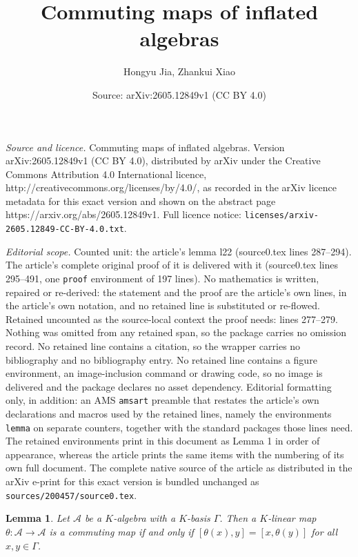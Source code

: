 \documentclass[10pt,a4paper]{amsart}
\title{Commuting maps of inflated algebras}
\author{Hongyu Jia, Zhankui Xiao}
\date{Source: arXiv:2605.12849v1 (CC BY 4.0)}
\newtheorem{lemma}{Lemma}
\begin{document}
\maketitle

\noindent\emph{Source and licence.} Commuting maps of inflated algebras. Version arXiv:2605.12849v1 (CC BY 4.0), distributed by arXiv under the Creative Commons Attribution 4.0 International licence, http://creativecommons.org/licenses/by/4.0/, as recorded in the arXiv licence metadata for this exact version and shown on the abstract page https://arxiv.org/abs/2605.12849v1. Full licence notice: \texttt{licenses/arxiv-2605.12849-CC-BY-4.0.txt}.\par\smallskip

\noindent\textit{Editorial scope.} Counted unit: the article's lemma l22 (source0.tex lines 287--294). The article's complete original proof of it is delivered with it (source0.tex lines 295--491, one \texttt{proof} environment of 197 lines). No mathematics is written, repaired or re-derived: the statement and the proof are the article's own lines, in the article's own notation, and no retained line is substituted or re-flowed.  Retained uncounted as the source-local context the proof needs: lines 277--279.  Nothing was omitted from any retained span, so the package carries no omission record.  No retained line contains a citation, so the wrapper carries no bibliography and no bibliography entry.  No retained line contains a figure environment, an image-inclusion command or drawing code, so no image is delivered and the package declares no asset dependency.  Editorial formatting only, in addition: an AMS \texttt{amsart} preamble that restates the article's own declarations and macros used by the retained lines, namely the environments \texttt{lemma} on separate counters, together with the standard packages those lines need.  The retained environments print in this document as Lemma 1 in order of appearance, whereas the article prints the same items with the numbering of its own full document.  The complete native source of the article as distributed in the arXiv e-print for this exact version is bundled unchanged as \texttt{sources/200457/source0.tex}.
\begin{lemma}\label{l21}
Let $\mathcal{A}$ be a $K$-algebra with a $K$-basis $\Gamma$. Then a $K$-linear map $\theta: \mathcal{A} \to \mathcal{A}$ is a commuting map if and only if $[\theta(x), y] = [x, \theta(y)]$ for all $x, y\in \Gamma$.
\end{lemma}
\end{document}

